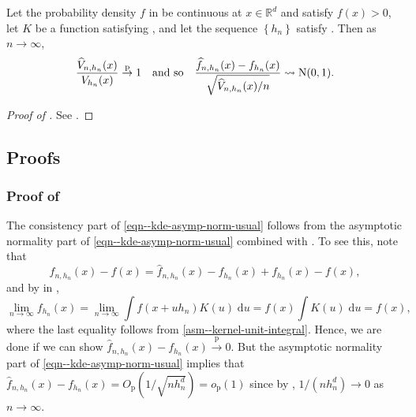 \begin{theorem}
\label{thm--kde-asymp-norm-conv-var}
Let the probability density \(f\) in  be continuous at \(x
\in \mathbb{R}^{d}\) and satisfy \(f (x) > 0\), let \(K\) be a function
satisfying , and let the sequence \(\left\{ h_{n} \right\}\)
satisfy .
Then as \(n \to \infty\),
\begin{equation}
  \frac{\widehat{V}_{n, h_{n}} (x)}{V_{h_{n}} (x)} \overset{\mathrm{p}}{\to} 1
  \quad \text{and so} \quad \frac{\widehat{f}_{n, h_{n}} (x) - f_{h_{n}}
  (x)}{\sqrt{\widehat{V}_{n, h_{n}} (x) / n}} \rightsquigarrow \mathrm{N} (0, 1).
  \label{eqn--kde-asymp-norm-conv-var}
\end{equation}
\end{theorem}

\begin{proof}[Proof of ]
See .
\end{proof}

\subsection{Proofs}

\subsubsection{Proof of
\texorpdfstring{}{Theorem
\ref{thm--kde-asymp-norm-usual}}}
\label{sec--prf--thm--kde-asymp-norm-usual}

The consistency part of \eqref{eqn--kde-asymp-norm-usual} follows from the
asymptotic normality part of \eqref{eqn--kde-asymp-norm-usual} combined with
.
To see this, note that
\begin{equation*}
  \widehat{f}_{n, h_{n}} (x) - f (x) = \widehat{f}_{n, h_{n}} (x) - f_{h_{n}}
  (x) + f_{h_{n}} (x) - f (x),
\end{equation*}
and by  in
,
\begin{equation*}
  \lim_{n \to \infty} f_{h_{n}} (x) = \lim_{n \to \infty} \int f \left( x + u
  h_{n} \right) K (u) \; \mathrm{d} u = f (x) \int K (u) \; \mathrm{d} u = f
  (x),
\end{equation*}
where the last equality follows from 
\ref{asm--kernel-unit-integral}.
Hence, we are done if we can show \(\widehat{f}_{n, h_{n}} (x) - f_{h_{n}} (x)
\overset{\mathrm{p}}{\to} 0\).
But the asymptotic normality part of
\eqref{eqn--kde-asymp-norm-usual} implies that
\(\widehat{f}_{n, h_{n}} (x) - f_{h_{n}} (x) = O_{\mathrm{p}} \left( 1 / \sqrt{n
h_{n}^{d}} \right) = o_{\mathrm{p}} (1)\) since by , \(1 /
\left( n h_{n}^{d} \right) \to 0\) as \(n \to \infty\).

